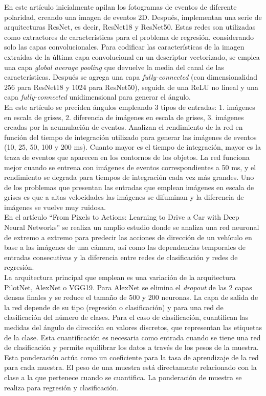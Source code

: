 En este artículo inicialmente apilan los fotogramas de eventos de diferente polaridad, creando una imagen de eventos 2D. Después, implementan una serie de arquitecturas ResNet, es decir, ResNet18 y ResNet50. Estas redes son utilizadas como extractores de características para el problema de regresión, considerando solo las capas convolucionales. Para codificar las características de la imagen extraídas de la última capa convolucional en un descriptor vectorizado, se emplea una capa \textit{global average pooling} que devuelve la media del canal de las características. Después se agrega una capa \textit{fully-connected} (con dimensionalidad 256 para ResNet18 y 1024 para ResNet50), seguida de una ReLU no lineal y una capa \textit{fully-connected} unidimensional para generar el ángulo.\\

En este artículo \cite{event} se preciden ángulos empleando 3 tipos de entradas: 1. imágenes en escala de grises, 2. diferencia de imágenes en escala de grises, 3. imágenes creadas por la acumulación de eventos. Analizan el rendimiento de la red en función del tiempo de integración utilizado para generar las imágenes de eventos (10, 25, 50, 100 y 200 ms). Cuanto mayor es el tiempo de integración, mayor es la traza de eventos que aparecen en los contornos de los objetos. La red funciona mejor cuando se entrena con imágenes de eventos correspondientes a 50 ms, y el rendimiento se degrada para tiempos de integración cada vez más grandes. Uno de los problemas que presentan las entradas que emplean imágenes en escala de grises es que a altas velocidades las imágenes se difuminan y la diferencia de imágenes se vuelve muy ruidosa.\\

En el artículo ``From Pixels to Actions: Learning to Drive a Car with Deep Neural Networks'' \cite{pixels} se realiza un amplio estudio donde se analiza una red neuronal de extremo a extremo para predecir las acciones de dirección de un vehículo en base a las imágenes de una cámara, así como las dependencias temporales de entradas consecutivas y la diferencia entre redes de clasificación y redes de regresión.\\

La arquitectura principal que emplean es una variación de la arquitectura PilotNet, AlexNet o VGG19. Para AlexNet se elimina el \textit{dropout} de las 2 capas densas finales y se reduce el tamaño de 500 y 200 neuronas. La capa de salida de la red depende de su tipo (regresión o clasificación) y para una red de clasificación del número de clases. Para el caso de clasificación, cuantifican las medidas del ángulo de dirección en valores discretos, que representan las etiquetas de la clase. Esta cuantificación es necesaria como entrada cuando se tiene una red de clasificación y permite equilibrar los datos a través de los pesos de la muestra. Esta ponderación actúa como un coeficiente para la tasa de aprendizaje de la red para cada muestra. El peso de una muestra está directamente relacionado con la clase a la que pertenece cuando se cuantifica. La ponderación de muestra se realiza para regresión y clasificación.\\

